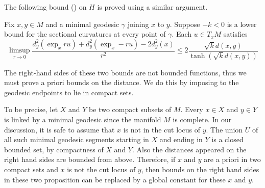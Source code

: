 The following bound (\cite[Lemma 3.12]{cordero2001riemannian}) on $H$ is proved using a similar argument.
\begin{prop}
	\label{lem:hessian_bound_distance_squared}
	Fix \(  x , y \in M \) and
	a minimal geodesic \( \gamma \) joining \( x \) to \( y \).
	Suppose \( - k < 0 \) is a lower bound for
	the sectional curvatures at every point of \( \gamma \).
	Each \( u \in T _ { x } M \) satisfies
	\begin{equation*}
		\label{equa:hessian_bound_distance_squared}
		\limsup _ { r \rightarrow 0 } \frac { d _ { y } ^ { 2 } \left( \exp _ { x } r u \right) + d _ { y } ^ { 2 } \left( \exp _ { x } - r u \right) - 2 d _ { y } ^ { 2 } ( x ) }
		{ r ^ { 2 } } \leq 2 \frac{ \sqrt { k } d ( x , y ) }
		{\tanh ( \sqrt { k } d ( x , y ) )}
	\end{equation*}
\end{prop}

\begin{rmk}
	\label{rmk:global_hessian_bound}
	The right-hand sides of these two bounds are not bounded functions,
	thus we must prove a priori bounds on the distance.
	We do this by imposing to the geodesic endpoints to lie in compact sets.

	To be precise, let $X$ and $Y$ be two compact subsets of $M$.
	Every \( x \in X \) and \( y \in Y \) is linked by a minimal geodesic since the manifold \( M \) is complete.
	In our discussion, it is safe to assume that $x$ is not in the cut locus of $y$.
	The union \( U \) of all such minimal geodesic segments
	starting in \( X \) and ending in \( Y \) is a closed bounded set, by compactness of \( X \) and \( Y \).
	Also the distances appeared on the right hand sides are bounded from above.
	Therefore,
	if $x$ and $y$ are a priori in two compact sets and $x$ is not the cut locus of $y$,
	then bounds on the right hand sides in these two proposition can be replaced by a global constant
	for these $x$ and $y$.
\end{rmk}


